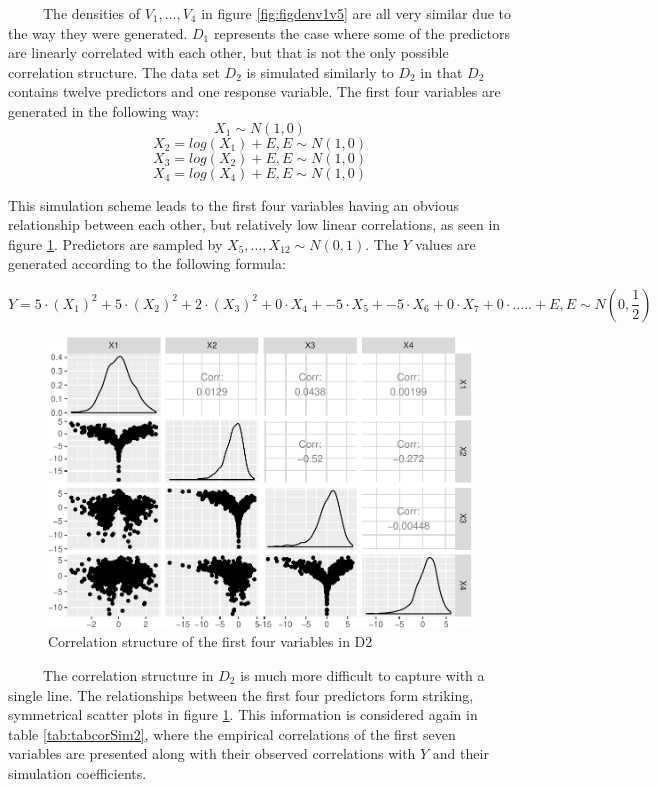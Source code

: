 \documentclass[12pt,twoside]{reedthesis}
\begin{document}
  ~~~~~The densities of \(V_1,...,V_4\) in figure \ref{fig:figdenv1v5} are
  all very similar due to the way they were generated. \(D_1\) represents
  the case where some of the predictors are linearly correlated with each
  other, but that is not the only possible correlation structure. The data
  set \(D_2\) is simulated similarly to \(D_2\) in that \(D_2\) contains
  twelve predictors and one response variable. The first four variables
  are generated in the following way: \[X_1 \sim N(1,0)\]
  \[X_2 = log(X_1) + E, E \sim N(1,0)\]
  \[X_3 = log(X_2) + E, E \sim N(1,0)\]
  \[X_4 = log(X_4) + E, E \sim N(1,0)\]
  
  This simulation scheme leads to the first four variables having an
  obvious relationship between each other, but relatively low linear
  correlations, as seen in figure \ref{fig:corstructd2}. Predictors are
  sampled by \(X_5,...,X_{12} \sim N(0,1)\). The \(Y\) values are
  generated according to the following formula:
  
  \[Y = 5 \cdot (X_1)^2 + 5 \cdot(X_2)^2 + 2 \cdot (X_3)^2 + 0 \cdot X_4 + -5 \cdot X_5 + -5\cdot X_6 + 0\cdot X_7 + 0 \cdot ..... + E, E \sim N(0,\frac 1 2 )\]
  
  \begin{figure}[htbp]
  \centering
  \includegraphics{Thesis_files/figure-latex/unnamed-chunk-12-1.pdf}
  \caption{\label{fig:unnamed-chunk-12}\label{fig:corstructd2}Correlation
  structure of the first four variables in D2}
  \end{figure}
  
  ~~~~~The correlation structure in \(D_2\) is much more difficult to
  capture with a single line. The relationships between the first four
  predictors form striking, symmetrical scatter plots in figure
  \ref{fig:corstructd2}. This information is considered again in table
  \ref{tab:tabcorSim2}, where the empirical correlations of the first
  seven variables are presented along with their observed correlations
  with \(Y\) and their simulation coefficients.
  
\end{document}
